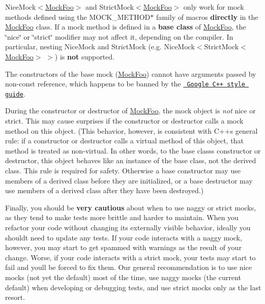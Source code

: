 \begin{DoxyEnumerate}
\item {\ttfamily Nice\+Mock$<$\mbox{\hyperlink{class_mock_foo}{Mock\+Foo}}$>$} and {\ttfamily Strict\+Mock$<$\mbox{\hyperlink{class_mock_foo}{Mock\+Foo}}$>$} only work for mock methods defined using the {\ttfamily M\+O\+C\+K\+\_\+\+M\+E\+T\+H\+O\+D$\ast$} family of macros {\bfseries{directly}} in the {\ttfamily \mbox{\hyperlink{class_mock_foo}{Mock\+Foo}}} class. If a mock method is defined in a {\bfseries{base class}} of {\ttfamily \mbox{\hyperlink{class_mock_foo}{Mock\+Foo}}}, the \char`\"{}nice\char`\"{} or \char`\"{}strict\char`\"{} modifier may not affect it, depending on the compiler. In particular, nesting {\ttfamily Nice\+Mock} and {\ttfamily Strict\+Mock} (e.\+g. {\ttfamily Nice\+Mock$<$Strict\+Mock$<$\mbox{\hyperlink{class_mock_foo}{Mock\+Foo}}$>$ $>$}) is {\bfseries{not}} supported.
\end{DoxyEnumerate}
\begin{DoxyEnumerate}
\item The constructors of the base mock ({\ttfamily \mbox{\hyperlink{class_mock_foo}{Mock\+Foo}}}) cannot have arguments passed by non-\/const reference, which happens to be banned by the \href{https://google.github.io/styleguide/cppguide.html}{\texttt{ Google C++ style guide}}.
\end{DoxyEnumerate}
\begin{DoxyEnumerate}
\item During the constructor or destructor of {\ttfamily \mbox{\hyperlink{class_mock_foo}{Mock\+Foo}}}, the mock object is {\itshape not} nice or strict. This may cause surprises if the constructor or destructor calls a mock method on {\ttfamily this} object. (This behavior, however, is consistent with C++\textquotesingle{}s general rule\+: if a constructor or destructor calls a virtual method of {\ttfamily this} object, that method is treated as non-\/virtual. In other words, to the base class\textquotesingle{}s constructor or destructor, {\ttfamily this} object behaves like an instance of the base class, not the derived class. This rule is required for safety. Otherwise a base constructor may use members of a derived class before they are initialized, or a base destructor may use members of a derived class after they have been destroyed.)
\end{DoxyEnumerate}

Finally, you should be {\bfseries{very cautious}} about when to use naggy or strict mocks, as they tend to make tests more brittle and harder to maintain. When you refactor your code without changing its externally visible behavior, ideally you should\textquotesingle{}t need to update any tests. If your code interacts with a naggy mock, however, you may start to get spammed with warnings as the result of your change. Worse, if your code interacts with a strict mock, your tests may start to fail and you\textquotesingle{}ll be forced to fix them. Our general recommendation is to use nice mocks (not yet the default) most of the time, use naggy mocks (the current default) when developing or debugging tests, and use strict mocks only as the last resort.

